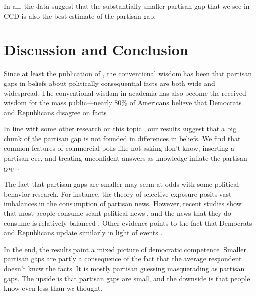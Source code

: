 \documentclass[12pt, letterpaper]{article}
\begin{document}
In all, the data suggest that the substantially smaller partisan gap that we see in CCD is also the best estimate of the partisan gap. 

\section*{Discussion and Conclusion}\label{sec:discussion}

Since at least the publication of \cite{bartels_2002}, the conventional wisdom has been that partisan gaps in beliefs about politically consequential facts are both wide and widespread. The conventional wisdom in academia has also become the received wisdom for the mass public---nearly 80\% of Americans believe that Democrats and Republicans disagree on facts \citep{pew2018disagree}.

In line with some other research on this topic \citep[][though see \citeauthor{berinsky_2017} \citeyear{berinsky_2017} and \citeauthor{peterson_iyengar_forth} \citeyear{peterson_iyengar_forth}]{bullocketal_2015, prior2015you, schaffner_luks}, our results suggest that a big chunk of the partisan gap is not founded in differences in beliefs. We find that common features of commercial polls like not asking don't know, inserting a partisan cue, and treating unconfident answers as knowledge inflate the partisan gaps.

The fact that partisan gaps are smaller may seem at odds with some political behavior research. For instance, the theory of selective exposure posits vast imbalances in the consumption of partisan news. However, recent studies show that most people consume scant political news \citep{Prior2007,flaxmanetal_2016}, and the news that they do consume is relatively balanced \citep{flaxmanetal_2016,garzetal_2018,gentzkowshapiro_2011,guess_2020}. Other evidence points to the fact that Democrats and Republicans update similarly in light of events \citep{gerber_annual_review,kernell_2019, coppock2021persuasion}.

In the end, the results paint a mixed picture of democratic competence. Smaller partisan gaps are partly a consequence of the fact that the average respondent doesn't know the facts. It is mostly partisan guessing masquerading as partisan gaps. The upside is that partisan gaps are small, and the downside is that people know even less than we thought.

\clearpage



\clearpage


\end{document}
